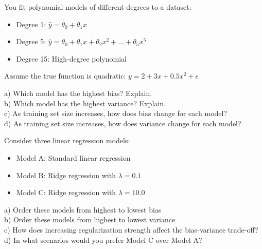 \documentclass{article}
\newcounter{exercise}
\begin{document}
\begin{tcolorbox}[colback=gray!5!white,colframe=gray!75!black,title=Problem \stepcounter{exercise}: Polynomial Regression Analysis]

You fit polynomial models of different degrees to a dataset:
\begin{itemize}
    \item Degree 1: $\hat{y} = \theta_0 + \theta_1 x$
    \item Degree 5: $\hat{y} = \theta_0 + \theta_1 x + \theta_2 x^2 + \ldots + \theta_5 x^5$
    \item Degree 15: High-degree polynomial
\end{itemize}

Assume the true function is quadratic: $y = 2 + 3x + 0.5x^2 + \epsilon$

a) Which model has the highest bias? Explain.\\
b) Which model has the highest variance? Explain.\\
c) As training set size increases, how does bias change for each model?\\
d) As training set size increases, how does variance change for each model?
\end{tcolorbox}

\begin{tcolorbox}[colback=gray!5!white,colframe=gray!75!black,title=Problem \stepcounter{exercise}: Regularization Effects]

Consider three linear regression models:
\begin{itemize}
    \item Model A: Standard linear regression
    \item Model B: Ridge regression with $\lambda = 0.1$
    \item Model C: Ridge regression with $\lambda = 10.0$
\end{itemize}

a) Order these models from highest to lowest bias\\
b) Order these models from highest to lowest variance\\
c) How does increasing regularization strength affect the bias-variance trade-off?\\
d) In what scenarios would you prefer Model C over Model A?
\end{tcolorbox}
\end{document}
